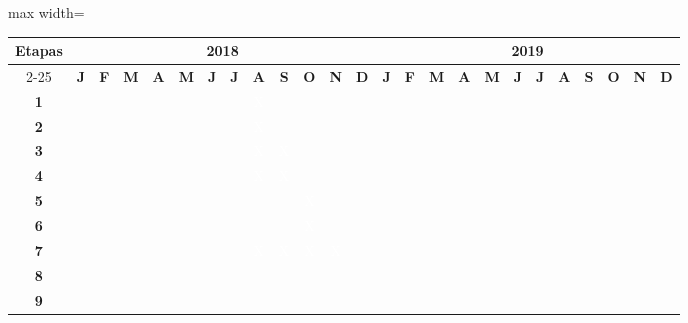 \begin{center}

\vspace{0.5cm}
{\tiny
\noindent \begin{adjustbox}{max width=\textwidth}\begin{tabular}{|c||c|c|c|c|c|c|c|c|c|c|c|c||c|c|c|c|c|c|c|c|c|c|c|c|}
  \hline
  \multirow{2}{*}{\textbf{\small{Etapas}}} & \multicolumn{12}{|c||}{\textbf{\small{2018}}} & \multicolumn{12}{|c|}{\textbf{\small{2019}}} \\
  \cline{2-25}
   & \textbf{J} & \textbf{F} & \textbf{M} & \textbf{A} & \textbf{M} & \textbf{J} & \textbf{J} & \textbf{A} & \textbf{S} & \textbf{O} & \textbf{N} & \textbf{D} & \textbf{J} & \textbf{F} & \textbf{M} & \textbf{A} & \textbf{M} & \textbf{J} & \textbf{J} & \textbf{A} & \textbf{S} & \textbf{O} & \textbf{N} & \textbf{D} \\
  \hline \hline
  \textbf{\small{ 1}} &  &  &  &  &  &  &  & \cellcolor{black} \textcolor{white}{X} &  &  &  &  &  &  &  &  &  &  &  &  &  &  &  & \\ \hline
  \textbf{\small{ 2}} &  &  &  &  &  &  &  & \cellcolor{black} \textcolor{white}{X} &  &  &  &  &  &  &  &  &  &  &  &  &  &  &  & \\ \hline
  \textbf{\small{ 3}} &  &  &  &  &  &  &  & \cellcolor{black} \textcolor{white}{X} & \cellcolor{black} \textcolor{white}{X} &  &  &  &  &  &  &  &  &  &  &  &  &  &  & \\ \hline
  \textbf{\small{ 4}} &  &  &  &  &  &  &  & \cellcolor{black} \textcolor{white}{X} & \cellcolor{black} \textcolor{white}{X} &  &  &  &  &  &  &  &  &  &  &  &  &  &  & \\ \hline
  \textbf{\small{ 5}} &  &  &  &  &  &  &  &  &  & \cellcolor{black} \textcolor{white}{X} &  &  &  &  &  &  &  &  &  &  &  &  &  & \\ \hline
  \textbf{\small{ 6}} &  &  &  &  &  &  &  &  &  & \cellcolor{black} \textcolor{white}{X} &  &  &  &  &  &  &  &  &  &  &  &  &  & \\ \hline
  \textbf{\small{ 7}} &  &  &  &  &  &  &  & \cellcolor{black} \textcolor{white}{X} & \cellcolor{black} \textcolor{white}{X} & \cellcolor{black} \textcolor{white}{X} & \cellcolor{black} \textcolor{white}{X} &  &  &  &  &  &  &  &  &  &  &  &  & \\ \hline
  \textbf{\small{ 8}} &  &  &  &  &  &  &  &  &  &  &  & \cellcolor{black} & \cellcolor{black} &  &  &  &  &  &  &  &  &  &  & \\ \hline
  \textbf{\small{ 9}} &  &  &  &  &  &  &  &  &  &  &  & \cellcolor{black} & \cellcolor{black} &  &  &  &  &  &  &  &  &  &  & \\ \hline

\end{tabular}
\end{adjustbox}}
\end{center}
